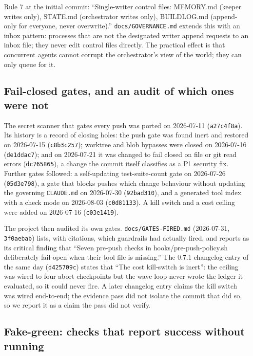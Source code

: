 \documentclass[11pt]{article}
\newcommand{\sha}[1]{\texttt{\small #1}}
\newcommand{\file}[1]{\texttt{\small #1}}
\begin{document}
Rule 7 at the initial commit: ``Single-writer control files: MEMORY.md (keeper writes only), STATE.md (orchestrator writes only), BUILDLOG.md (append-only for everyone, never overwrite).'' \file{docs/GOVERNANCE.md} extends this with an inbox pattern: processes that are not the designated writer append requests to an inbox file; they never edit control files directly. The practical effect is that concurrent agents cannot corrupt the orchestrator's view of the world; they can only queue for it.

\subsection{Fail-closed gates, and an audit of which ones were not}

The secret scanner that gates every push was ported on 2026-07-11 (\sha{a27c4f8a}). Its history is a record of closing holes: the push gate was found inert and restored on 2026-07-15 (\sha{c8b3c257}); worktree and blob bypasses were closed on 2026-07-16 (\sha{de1ddac7}); and on 2026-07-21 it was changed to fail closed on file or git read errors (\sha{dc765865}), a change the commit itself classifies as a P1 security fix. Further gates followed: a self-updating test-suite-count gate on 2026-07-26 (\sha{05d3e798}), a gate that blocks pushes which change behaviour without updating the governing \file{CLAUDE.md} on 2026-07-30 (\sha{92bad310}), and a generated tool index with a check mode on 2026-08-03 (\sha{c0d81133}). A kill switch and a cost ceiling were added on 2026-07-16 (\sha{c03e1419}).

The project then audited its own gates. \file{docs/GATES-FIRED.md} (2026-07-31, \sha{3f0aebab}) lists, with citations, which guardrails had actually fired, and reports as its critical finding that ``Seven pre-push checks in hooks/pre-push-policy.sh deliberately fail-open when their tool file is missing.'' The 0.7.1 changelog entry of the same day (\sha{d425709c}) states that ``The cost kill-switch is inert'': the ceiling was wired to four abort checkpoints but the wave loop never wrote the ledger it evaluated, so it could never fire. A later changelog entry claims the kill switch was wired end-to-end; the evidence pass did not isolate the commit that did so, so we report it as a claim the pass did not verify.

\subsection{Fake-green: checks that report success without running}
\label{sec:fakegreen}
\end{document}
